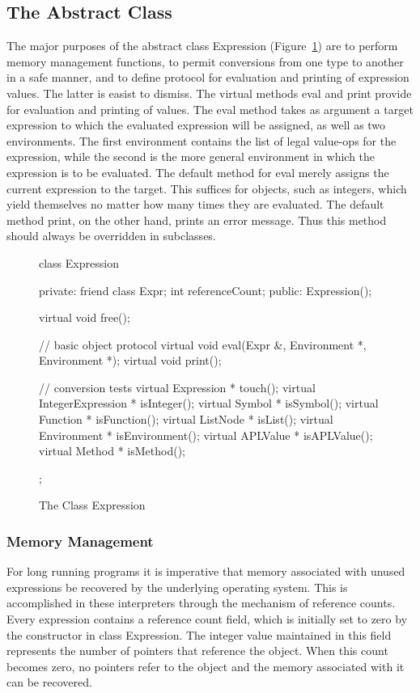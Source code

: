 \subsection{The Abstract Class}

The major purposes of the abstract class {\sf Expression} 
(Figure~\ref{expression}) are to perform memory management functions, to
permit conversions from one type to another in a safe manner, and to define
protocol for evaluation and printing of expression values.  The latter is
easist to dismiss.  The virtual methods {\sf eval} and {\sf print} provide
for evaluation and printing of values.  The {\sf eval} method takes as
argument a target expression to which the evaluated expression will be
assigned, as well as two environments.  The first environment contains the
list of legal value-ops for the expression, while the second is the more
general environment in which the expression is to be evaluated.
The default method for {\sf eval} merely assigns the current expression to
the target.  This suffices for objects, such as integers, which yield
themselves no matter how many times they are evaluated.
The default method {\sf print}, on the other hand, prints an error message.
Thus this method should always be overridden in subclasses.

\begin{figure}
\begin{cprog}
class Expression {
private:
	friend class Expr;
	int referenceCount;
public:
	Expression();

	virtual void free();

	// basic object protocol
	virtual void eval(Expr &, Environment *, Environment *);
	virtual void print();

	// conversion tests
	virtual Expression * touch();
	virtual IntegerExpression * isInteger();
	virtual Symbol * isSymbol();
	virtual Function * isFunction();
	virtual ListNode * isList();
	virtual Environment * isEnvironment();
	virtual APLValue * isAPLValue();
	virtual Method * isMethod();
};
\end{cprog}
\caption{The Class {\sf Expression}}\label{expression}
\end{figure}

\subsubsection{Memory Management}

For long running programs it is imperative that memory associated with
unused expressions be recovered by the underlying operating system.
This is accomplished in these interpreters through the mechanism of
reference counts.  Every expression contains a reference count field,
which is initially set to zero by the constructor in class {\sf Expression}.
The integer value maintained in this field represents the number of
pointers that reference the object.  When this count becomes zero, no
pointers refer to the object and the memory associated with it can be
recovered.

